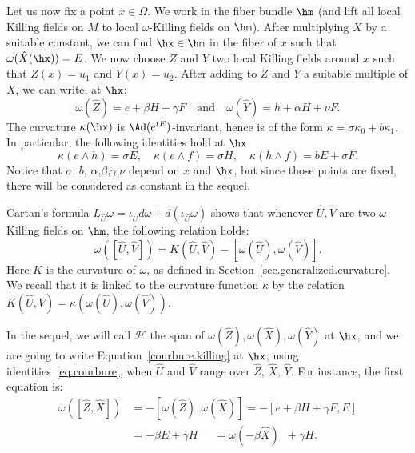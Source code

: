 Let us now fix a point $x \in \Omega$. We work in the fiber bundle $\hm$ (and lift all local Killing fields on $M$ to local $\omega$-Killing fields on $\hm$). After multiplying $X$ by a suitable constant, we can find $\hx \in \hm$ in the fiber of $x$ such that $\omega(\hat{X}(\hx))=E$. We now choose $Z$ and $Y$ two local Killing fields around $x$ such that $Z(x)=u_1$ and $Y(x)=u_2$. After adding to $Z$ and $Y$ a suitable multiple of $X$, we can write, at $\hx$:
\[
\omega(\hat{Z})=e+\beta H + \gamma F \quad \text{and}\quad \omega(\hat{Y})=h+\alpha H +\nu F.
\]
The curvature $\kappa(\hx)$ is $\Ad(e^{tE})$-invariant, hence is of the form $\kappa=\sigma \kappa_0 +b \kappa_1$. In particular, the following identities hold at $\hx$:
\begin{equation}\label{eq.courbure}
\kappa(e \wedge h)= \sigma E, \quad \kappa(e \wedge f)=\sigma H, \quad \kappa(h \wedge f)=bE+\sigma F.
\end{equation}
Notice that $\sigma$, $b$, $\alpha$,$\beta$,$\gamma$,$\nu$ depend on $x$ and $\hx$, but since those points are fixed, there will be considered as constant in the sequel.



Cartan's formula $L_{\hat{U}} \omega= \iota_{\hat{U}} d \omega + d(\iota_{\hat{U}} \omega)$ shows that whenever $\hat{U},\hat{V}$ are two $\omega$-Killing fields on $\hm$, the following relation holds:
\begin{equation}\label{courbure.killing}
\omega([\hat{U},\hat{V}])=K(\hat{U},\hat{V})-[\omega(\hat{U}),\omega(\hat{V})].
\end{equation}
Here $K$ is the curvature of $\omega$, as defined in Section~\ref{sec.generalized.curvature}. We recall that it is linked to the curvature function $\kappa$ by the relation $K(\hat{U},\hat{V})=\kappa(\omega(\hat{U}),\omega(\hat{V}))$.

In the sequel, we will call ${\mathcal H}$ the span of $\omega(\hat{Z}),\omega(\hat{X}),\omega(\hat{Y})$ at $\hx$, and we are going to write Equation~\eqref{courbure.killing} at $\hx$, using identities~\eqref{eq.courbure}, when $\hat{U}$ and $\hat{V}$ range over $\hat{Z}$, $\hat{X}$, $\hat{Y}$. For instance, the first equation is:
\begin{align*}
\omega([\hat{Z},\hat{X}])&=-[\omega(\hat{Z}),\omega(\hat{X})] = -[e+ \beta H + \gamma F,E] \\
&= - \beta E + \gamma H \quad\;\,= \omega(- \beta \hat{X}) \;\:+ \gamma H.
\end{align*}

